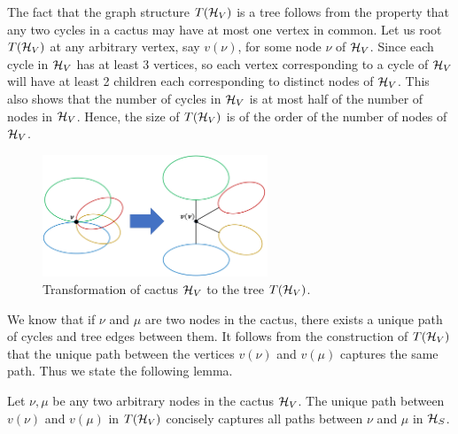 The fact that the graph structure $T({\cal H}_V)$ is a tree follows from the property that any two cycles in a cactus may have at most one vertex in common. Let us root $T({\cal H}_V)$ at any arbitrary vertex, say $v(\nu)$, for some node $\nu$ of ${\cal H}_V$. Since each cycle in ${\cal H}_V$ has at least 3 vertices, so each vertex corresponding to a cycle of ${\cal H}_V$ will have at least 2 children each corresponding to distinct nodes of ${\cal H}_V$. This also shows that the number of cycles in ${\cal H}_V$ is at most half of the number of nodes in ${\cal H}_V$. Hence, the size of $T({\cal H}_V)$ is of the order of the number of nodes of ${\cal H}_V$. 

\begin{figure}
\centering
\includegraphics[width=0.6\textwidth]{src/images/Cactus-transformation.png}
    \caption{Transformation of cactus ${\cal H}_V$ to the tree $T({\cal H}_V)$.}
\label{fig:transform-cactus-to-tree}
\end{figure}

We know that if $\nu$ and $\mu$ are two nodes in the cactus, there exists a unique path of cycles and tree edges between them. It follows from the construction of $T({\cal H}_V)$ that the unique path between the vertices $v(\nu)$ and $v(\mu)$ captures the same path. Thus we state the following lemma.

\begin{lemma}
Let $\nu,\mu$ be any two arbitrary nodes in the cactus 
${\cal H}_V$. The unique path between $v(\nu)$ and $v(\mu)$ in $T({\cal H}_V)$ concisely captures all
paths between $\nu$ and $\mu$ in ${\cal H}_S$.
\label{lem:path-in-T(H_S)}
\end{lemma}

